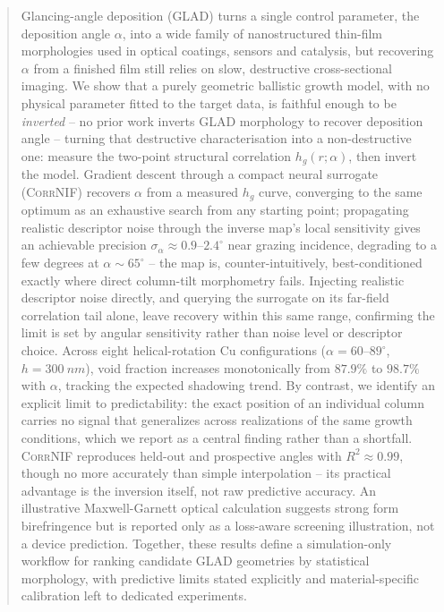 \documentclass[aip,amsmath,amssymb,reprint]{revtex4-1}
\newcommand{\dang}{\ensuremath{\alpha}}
\begin{document}
\begin{abstract}
Glancing-angle deposition (GLAD) turns a single control parameter, the
deposition angle $\dang$, into a wide family of nanostructured thin-film
morphologies used in optical coatings, sensors and catalysis, but
recovering $\dang$ from a finished film still relies on slow, destructive
cross-sectional imaging. We show that a purely geometric ballistic growth
model, with no physical parameter fitted to the target data, is faithful
enough to be \emph{inverted} -- no prior
work inverts GLAD morphology to recover deposition angle -- turning that
destructive characterisation into a non-destructive one: measure the
two-point structural correlation $h_g(r;\dang)$, then invert the model.
Gradient descent through a compact neural surrogate (\textsc{CorrNIF})
recovers $\dang$ from a measured $h_g$ curve, converging to the same
optimum as an exhaustive search from any starting point; propagating
realistic descriptor noise through the inverse map's local sensitivity
gives an achievable precision $\sigma_{\dang}\approx0.9$--$2.4^{\circ}$ near
grazing incidence, degrading to a few degrees at $\dang\sim65^{\circ}$ --
the map is, counter-intuitively, best-conditioned exactly where direct
column-tilt morphometry fails. Injecting realistic descriptor noise
directly, and querying the surrogate on its far-field correlation tail
alone, leave recovery within this same range, confirming the limit is
set by angular sensitivity rather than noise level or descriptor choice. Across eight helical-rotation Cu
configurations ($\dang=60$--$89^{\circ}$, $h=\SI{300}{nm}$), void fraction
increases monotonically from $87.9\%$ to $98.7\%$ with $\dang$, tracking
the expected shadowing trend. By contrast, we identify an explicit limit to
predictability: the exact position of an individual column carries no
signal that generalizes across realizations of the same growth conditions,
which we report as a central finding rather than a shortfall.
\textsc{CorrNIF} reproduces held-out and prospective angles with
$R^2\approx0.99$, though no more accurately than simple interpolation --
its practical advantage is the inversion itself, not raw predictive
accuracy. An illustrative Maxwell-Garnett optical calculation suggests
strong form birefringence but is reported only as a loss-aware screening
illustration, not a device prediction. Together, these results define a
simulation-only workflow for ranking candidate GLAD geometries by
statistical morphology, with predictive limits stated explicitly and
material-specific calibration left to dedicated experiments.
\end{abstract}
\end{document}
